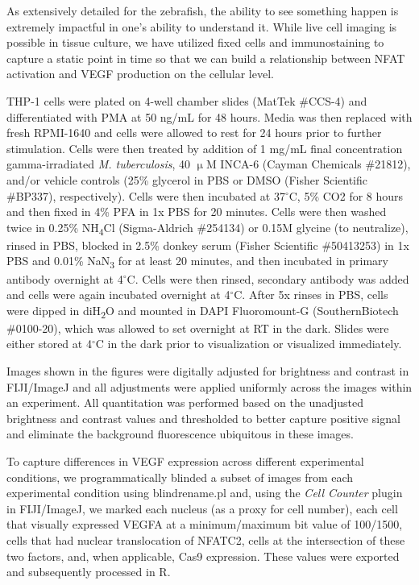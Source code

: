 As extensively detailed for the zebrafish, the ability to see something happen is extremely impactful in one's ability to understand it. While live cell imaging is possible in tissue culture, we have utilized fixed cells and immunostaining to capture a static point in time so that we can build a relationship between NFAT activation and VEGF production on the cellular level. 

THP-1 cells were plated on 4-well chamber slides (MatTek \#CCS-4) and differentiated with PMA at 50 ng/mL for 48 hours. Media was then replaced with fresh RPMI-1640 and cells were allowed to rest for 24 hours prior to further stimulation. Cells were then treated by addition of 1 mg/mL final concentration gamma-irradiated \textit{M. tuberculosis}, 40 $\upmu$M INCA-6 (Cayman Chemicals \#21812), and/or vehicle controls (25\% glycerol in PBS or DMSO (Fisher Scientific \#BP337), respectively). Cells were then incubated at 37$^{\circ}$C, 5\% CO2 for 8 hours and then fixed in 4\% PFA in 1x PBS for 20 minutes. Cells were then washed twice in 0.25\% NH\textsubscript{4}Cl (Sigma-Aldrich \#254134) or 0.15M glycine (to neutralize), rinsed in PBS, blocked in 2.5\% donkey serum (Fisher Scientific \#50413253) in 1x PBS and 0.01\% NaN\textsubscript{3} for at least 20 minutes, and then incubated in primary antibody overnight at 4$^{\circ}$C. Cells were then rinsed, secondary antibody was added and cells were again incubated overnight at 4$^{\circ}$C. After 5x rinses in PBS, cells were dipped in diH\textsubscript{2}O and mounted in DAPI Fluoromount-G (SouthernBiotech \#0100-20), which was allowed to set overnight at RT in the dark. Slides were either stored at 4$^{\circ}$C in the dark prior to visualization or visualized immediately. 

Images shown in the figures were digitally adjusted for brightness and contrast in FIJI/ImageJ \citep{Schindelin2012} and all adjustments were applied uniformly across the images within an experiment. All quantitation was performed based on the unadjusted brightness and contrast values and thresholded to better capture positive signal and eliminate the background fluorescence ubiquitous in these images.

To capture differences in VEGF expression across different experimental conditions, we programmatically blinded a subset of images from each experimental condition using blindrename.pl \citep{Salter2016} and, using the \textit{Cell Counter} plugin in FIJI/ImageJ, we marked each nucleus (as a proxy for cell number), each cell that visually expressed VEGFA at a minimum/maximum bit value of 100/1500, cells that had nuclear translocation of NFATC2, cells at the intersection of these two factors, and, when applicable, Cas9 expression. These values were exported and subsequently processed in R.

